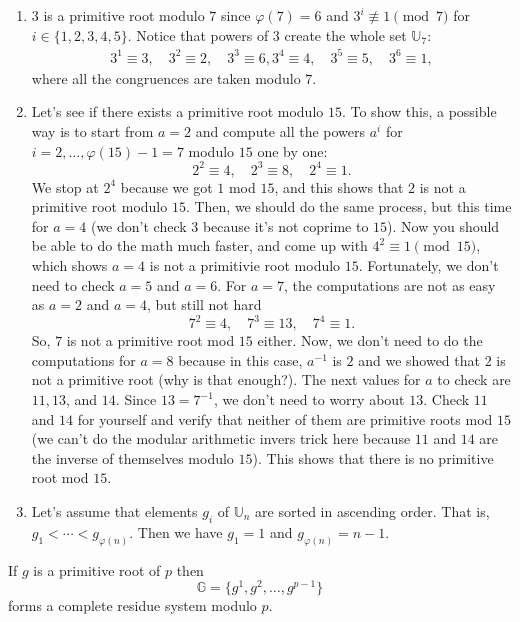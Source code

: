 \documentclass{subfile}
\begin{document}
		\begin{example}
		$ $
		\begin{enumerate}
			\item $3$ is a primitive root modulo $7$ since $\varphi(7)=6$ and $3^i\not\equiv1\pmod 7$ for $i\in\{1,2,3,4,5\}$. Notice that powers of $3$ create the whole set $\mathbb U_7$:
			\begin{align*}
				3^1 \equiv 3, \quad 3^2 \equiv 2, \quad 3^3 \equiv 6, 3^4 \equiv 4, \quad 3^5 \equiv 5, \quad 3^6 \equiv 1,
			\end{align*}
			where all the congruences are taken modulo $7$.
			\item Let's see if there exists a primitive root modulo $15$. To show this, a possible way is to start from $a=2$ and compute all the powers $a^i$ for $i=2,\ldots,\varphi(15)-1=7$ modulo $15$ one by one:
			$$ 2^2 \equiv 4, \quad 2^3 \equiv 8, \quad 2^4 \equiv 1.$$
			We stop at $2^4$ because we got $1$ mod $15$, and this shows that $2$ is not a primitive root modulo $15$. Then, we should do the same process, but this time for $a=4$ (we don't check $3$ because it's not coprime to $15$). Now you should be able to do the math much faster, and come up with $4^2 \equiv 1 \pmod{15}$, which shows $a=4$ is not a primitivie root modulo $15$. Fortunately, we don't need to check $a=5$ and $a=6$. For $a=7$, the computations are not as easy as $a=2$ and $a=4$, but still not hard
			$$7^2 \equiv 4, \quad 7^3 \equiv 13, \quad 7^4 \equiv 1.$$
			So, $7$ is not a primitive root mod $15$ either. Now, we don't need to do the computations for $a=8$ because in this case, $a^{-1}$ is $2$ and we showed that $2$ is not a primitive root (why is that enough?). The next values for $a$ to check are $11, 13$, and $14$. Since $13=7^{-1}$, we don't need to worry about $13$. Check $11$ and $14$ for yourself and verify that neither of them are primitive roots mod $15$ (we can't do the modular arithmetic invers trick here because $11$ and $14$ are the inverse of themselves modulo $15$). This shows that there is no primitive root mod $15$.

			\item Let's assume that elements $g_i$ of $\mathbb U_n$ are sorted in ascending order. That is, $g_1<\cdots<g_{\varphi(n)}$. Then we  have $g_1=1$ and $g_{\varphi(n)}=n-1$.
		\end{enumerate}
	\end{example}


	\begin{corollary}\label{cor:prres}
		If $g$ is a primitive root of $p$ then
		\[\mathbb G=\{g^1,g^2,\ldots,g^{p-1}\}\]
		forms a complete residue system modulo $p$.
	\end{corollary}
\end{document}
